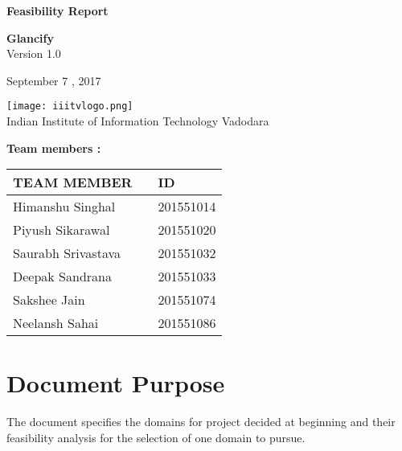 \documentclass[12pt]{article}
\renewcommand{\today}{September 7 , 2017}
\begin{document}
\begin{titlepage}
		\begin{center}
			
			
			\LARGE{\textbf{Feasibility Report}}
			
			\vspace{1.5cm}
			
			\textbf{Glancify}\\
			
			\small{Version 1.0}
			\vspace{2cm}
		 
        	
			
			\vspace{1.5cm}
			
			\today
			
			\vspace{5cm}
			\texttt{[image: iiitvlogo.png]} \\
			\Large{Indian Institute of Information Technology Vadodara} \\
			
		\end{center}
	\end{titlepage}
	\newpage
\textbf{Team members :} \\
\begin{center}
	\begin{tabular}{ |m{10em} m{8em} m{9em}|}
		\hline
		TEAM MEMBER        &   & ID        \\
		\hline
		Himanshu Singhal             &   & 201551014 \\
	Piyush Sikarawal          &   & 201551020 \\
		Saurabh Srivastava              &   & 201551032 \\
	    Deepak Sandrana     &   & 201551033 \\
		Sakshee Jain    &   & 201551074 \\
		Neelansh Sahai    &   & 201551086 \\ 
		\hline
	\end{tabular}
	
\end{center}

	\newpage
	\tableofcontents
	\newpage
	
	\section{Document Purpose }
	 The document specifies the domains for project decided at beginning and their feasibility analysis for the selection of one domain to pursue.
\end{document}
